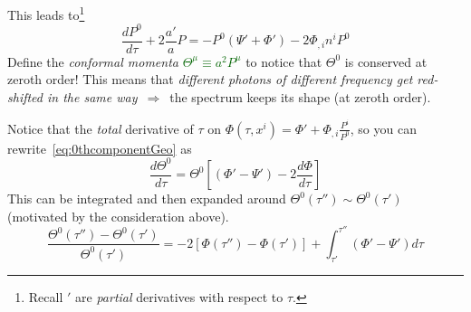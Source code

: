 This leads to\footnote{Recall $'$ are \emph{partial} derivatives with respect to $\tau$.}
\begin{equation}\label{eq:0thcomponentGeo}
    \frac{dP^0}{d \tau} + 2\frac{a'}{a}P = -P^0 \left(\Psi'+\Phi'\right) -2\Phi_{,i}n^i P^0 
\end{equation}
Define the \textit{conformal momenta} \textcolor{darkgreen}{$\varTheta^\mu \equiv  a^2 P^\mu $} to notice that $\varTheta^0$ is conserved at zeroth order! This means that 
\emph{different photons of different frequency get red-shifted in the same way} $\,\Rightarrow\,$ the spectrum keeps its shape (at zeroth order).

Notice that the \emph{total} derivative of $\tau$ on $\Phi(\tau,x^i) = \Phi'+ \Phi_{,i} \tfrac{P^i}{P^0}$, so you can rewrite~\eqref{eq:0thcomponentGeo} as
\begin{equation}
    \frac{d\varTheta^0}{d \tau} = \varTheta^0 \left[\left(\Phi' - \Psi' \right) - 2  \frac{d\Phi}{d\tau}\right]
\end{equation}
This can be integrated and then expanded around $\varTheta^0(\tau'') \sim  \varTheta^0(\tau')$ (motivated by the consideration above).
\begin{equation}\label{eq:momentaShifts}
    \frac{\Theta^{0}(\tau'')-\Theta^{0}(\tau')}{\Theta^{0}(\tau')} = - 2\left[\Phi(\tau'')-\Phi(\tau')\right] + \int_{\tau'}^{\tau''} \left(\Phi'-\Psi'\right)d\tau 
\end{equation}


